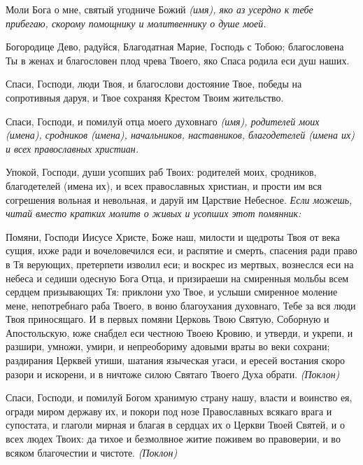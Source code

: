 

Моли Бога о мне, святый угодниче Божий \itshape (имя)\normalfont{}, яко аз усердно к тебе прибегаю, скорому помощнику и молитвеннику о душе моей. 




Богородице Дево, радуйся, Благодатная Марие, Господь с Тобою; благословена Ты в женах и благословен плод чрева Твоего, яко Спаса родила еси душ наших. 




Спаси, Господи, люди Твоя, и благослови достояние Твое, победы на сопротивныя даруя, и Твое сохраняя Крестом Твоим жительство.



Спаси, Господи, и помилуй отца моего духовнаго \itshape (имя)\normalfont{}, родителей моих \itshape (имена)\normalfont{}, сродников \itshape (имена)\normalfont{}, начальников, наставников, благодетелей \itshape (имена их)\normalfont{} и всех православных христиан.




Упокой, Господи, души усопших раб Твоих: родителей моих, сродников, благодетелей (имена их), и всех православных христиан, и прости им вся согрешения вольная и невольная, и даруй им Царствие Небесное. 
\itshape Если можешь, читай вместо кратких молитв о живых и усопших этот помянник:\normalfont{}



Помяни, Господи Иисусе Христе, Боже наш, милости и щедроты Твоя от века сущия, ихже ради и вочеловечился еси, и распятие и смерть, спасения ради право в Тя верующих, претерпети изволил еси; и воскрес из мертвых, вознеслся еси на небеса и седиши одесную Бога Отца, и призираеши на смиренныя мольбы всем сердцем призывающих Тя: приклони ухо Твое, и услыши смиренное моление мене, непотребнаго раба Твоего, в воню благоухания духовнаго, Тебе за вся люди Твоя приносящаго. И в первых помяни Церковь Твою Святую, Соборную и Апостольскую, юже снабдел еси честною Твоею Кровию, и утверди, и укрепи, и разшири, умножи, умири, и непреобориму адовыми враты во веки сохрани; раздирания Церквей утиши, шатания языческая угаси, и ересей востания скоро разори и искорени, и в ничтоже силою Святаго Твоего Духа обрати. \itshape (Поклон)\normalfont{} 

Спаси, Господи, и помилуй Богом хранимую страну нашу, власти и воинство ея, огради миром державу их, и покори под нозе Православных всякаго врага и супостата, и глаголи мирная и благая в сердцах их о Церкви Твоей Святей, и о всех людех Твоих: да тихое и безмолвное житие поживем во правоверии, и во всяком благочестии и чистоте. \itshape (Поклон)\normalfont{} 

